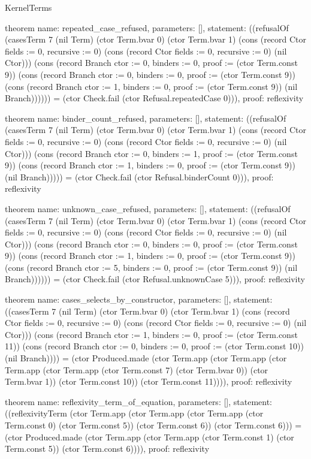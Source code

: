 \begin{lexlean}{KernelTerms}
\begin{semanticmodule}
theorem{
  name: repeated_case_refused,
  parameters: [],
  statement: ((refusalOf (casesTerm 7 (nil Term) (ctor Term.bvar 0) (ctor Term.bvar 1) (cons (record Ctor {fields := 0, recursive := 0}) (cons (record Ctor {fields := 0, recursive := 0}) (nil Ctor))) (cons (record Branch {ctor := 0, binders := 0, proof := (ctor Term.const 9)}) (cons (record Branch {ctor := 0, binders := 0, proof := (ctor Term.const 9)}) (cons (record Branch {ctor := 1, binders := 0, proof := (ctor Term.const 9)}) (nil Branch)))))) = (ctor Check.fail (ctor Refusal.repeatedCase 0))),
  proof: reflexivity{}
}

theorem{
  name: binder_count_refused,
  parameters: [],
  statement: ((refusalOf (casesTerm 7 (nil Term) (ctor Term.bvar 0) (ctor Term.bvar 1) (cons (record Ctor {fields := 0, recursive := 0}) (cons (record Ctor {fields := 0, recursive := 0}) (nil Ctor))) (cons (record Branch {ctor := 0, binders := 1, proof := (ctor Term.const 9)}) (cons (record Branch {ctor := 1, binders := 0, proof := (ctor Term.const 9)}) (nil Branch))))) = (ctor Check.fail (ctor Refusal.binderCount 0))),
  proof: reflexivity{}
}

theorem{
  name: unknown_case_refused,
  parameters: [],
  statement: ((refusalOf (casesTerm 7 (nil Term) (ctor Term.bvar 0) (ctor Term.bvar 1) (cons (record Ctor {fields := 0, recursive := 0}) (cons (record Ctor {fields := 0, recursive := 0}) (nil Ctor))) (cons (record Branch {ctor := 0, binders := 0, proof := (ctor Term.const 9)}) (cons (record Branch {ctor := 1, binders := 0, proof := (ctor Term.const 9)}) (cons (record Branch {ctor := 5, binders := 0, proof := (ctor Term.const 9)}) (nil Branch)))))) = (ctor Check.fail (ctor Refusal.unknownCase 5))),
  proof: reflexivity{}
}

theorem{
  name: cases_selects_by_constructor,
  parameters: [],
  statement: ((casesTerm 7 (nil Term) (ctor Term.bvar 0) (ctor Term.bvar 1) (cons (record Ctor {fields := 0, recursive := 0}) (cons (record Ctor {fields := 0, recursive := 0}) (nil Ctor))) (cons (record Branch {ctor := 1, binders := 0, proof := (ctor Term.const 11)}) (cons (record Branch {ctor := 0, binders := 0, proof := (ctor Term.const 10)}) (nil Branch)))) = (ctor Produced.made (ctor Term.app (ctor Term.app (ctor Term.app (ctor Term.app (ctor Term.const 7) (ctor Term.bvar 0)) (ctor Term.bvar 1)) (ctor Term.const 10)) (ctor Term.const 11)))),
  proof: reflexivity{}
}

theorem{
  name: reflexivity_term_of_equation,
  parameters: [],
  statement: ((reflexivityTerm (ctor Term.app (ctor Term.app (ctor Term.app (ctor Term.const 0) (ctor Term.const 5)) (ctor Term.const 6)) (ctor Term.const 6))) = (ctor Produced.made (ctor Term.app (ctor Term.app (ctor Term.const 1) (ctor Term.const 5)) (ctor Term.const 6)))),
  proof: reflexivity{}
}


\end{semanticmodule}
\end{lexlean}
